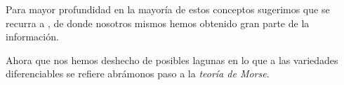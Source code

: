 \bigskip

Para mayor profundidad en la mayoría de estos conceptos sugerimos que se recurra a \cite{GonzalezPrietoVariedades}, de donde nosotros mismos hemos obtenido gran parte de la información. 

Ahora que nos hemos deshecho de posibles lagunas en lo que a las variedades diferenciables se refiere abrámonos paso a la \textit{teoría de Morse}.